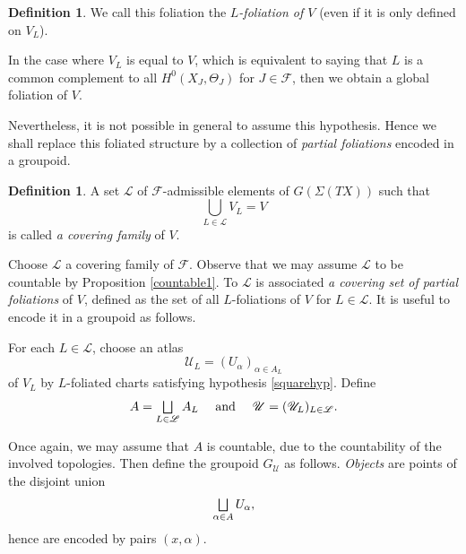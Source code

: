 \documentclass[10pt]{amsart}
\let\mathcal\mathscr
\let\oldbigsqcup\bigsqcup
\renewcommand{\bigsqcup}{\mathop{\textstyle\oldbigsqcup}\displaylimits}
\theoremstyle{plain}
\theoremstyle{definition}
\newtheorem{definition}[theorem]{Definition}
\theoremstyle{remark}
\numberwithin{equation}{section}
\let\uniondisjointe\bigsqcup
\begin{document}
\begin{definition}
\label{Lfoliation}
We call this foliation the \emph{$L$-foliation of $V$} (even if it is only defined on $V_L$).
\end{definition}

In the case where $V_L$ is equal to $V$, which is equivalent to saying that $L$ is a common complement to all $H^0(X_J,\Theta_J)$ for $J\in \mathcal F$, then we obtain a global foliation of $V$.

Nevertheless, it is not possible in general to assume this hypothesis. Hence we shall replace this foliated structure by a collection of \emph{partial foliations} encoded in a groupoid.
\begin{definition}
\label{coveringfamily}
A set $\mathcal L$ of $\mathcal F$-admissible elements of $G(\Sigma (TX))$ such that
\begin{equation}
\label{CF}
\bigcup_{L\in\mathcal L} V_L=V
\end{equation}
is called \emph{a covering family} of $V$.
\end{definition}

Choose $\mathcal L$ a covering family of $\mathcal F$. Observe that we may assume $\mathcal L$ to be countable by Proposition \ref{countable1}. To $\mathcal L$ is associated \emph{a covering set of partial foliations} of $V$, defined as the set of all $L$-foliations of $V$ for $L\in\mathcal L$. It is useful to encode it in a groupoid as follows.

For each $L\in\mathcal L$, choose an atlas
\begin{equation}
\label{atlas1}
\mathcal U_L=(U_{\alpha})_{\alpha\in A_L}
\end{equation}
of $V_L$ by $L$-foliated charts satisfying hypothesis \ref{squarehyp}. Define
\begin{equation}
\label{A}
A=\uniondisjointe_{L\in\mathcal L}A_L\quad\text{ and }\quad \mathcal U=(\mathcal U_L)_{L\in\mathcal L}.
\end{equation}

Once again, we may assume that $A$ is countable, due to the countability of the involved topologies. Then define the groupoid $G_{\mathcal U}$ as follows.
\emph{Objects} are points of the disjoint union
\begin{equation}
\label{objects}
\uniondisjointe _{\alpha\in A} U_{\alpha},
\end{equation}
hence are encoded by pairs $(x,\alpha)$.
\end{document}
